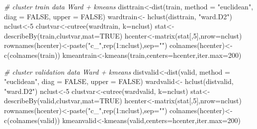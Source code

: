 \documentclass[
  11pt,
]{article}
\newenvironment{Shaded}{\begin{snugshade}}{\end{snugshade}}
\newcommand{\AttributeTok}[1]{\textcolor[rgb]{0.77,0.63,0.00}{#1}}
\newcommand{\CommentTok}[1]{\textcolor[rgb]{0.56,0.35,0.01}{\textit{#1}}}
\newcommand{\ConstantTok}[1]{\textcolor[rgb]{0.00,0.00,0.00}{#1}}
\newcommand{\DecValTok}[1]{\textcolor[rgb]{0.00,0.00,0.81}{#1}}
\newcommand{\FunctionTok}[1]{\textcolor[rgb]{0.00,0.00,0.00}{#1}}
\newcommand{\NormalTok}[1]{#1}
\newcommand{\OtherTok}[1]{\textcolor[rgb]{0.56,0.35,0.01}{#1}}
\newcommand{\SpecialCharTok}[1]{\textcolor[rgb]{0.00,0.00,0.00}{#1}}
\newcommand{\StringTok}[1]{\textcolor[rgb]{0.31,0.60,0.02}{#1}}
\begin{document}
\begin{Shaded}
\begin{Highlighting}[]
  \CommentTok{\# cluster train data Ward + kmeans}
\NormalTok{  disttrain}\OtherTok{\textless{}{-}}\FunctionTok{dist}\NormalTok{(train, }\AttributeTok{method =} \StringTok{"euclidean"}\NormalTok{, }\AttributeTok{diag =} \ConstantTok{FALSE}\NormalTok{, }\AttributeTok{upper =} \ConstantTok{FALSE}\NormalTok{)}
\NormalTok{  wardtrain}\OtherTok{\textless{}{-}} \FunctionTok{hclust}\NormalTok{(disttrain, }\StringTok{"ward.D2"}\NormalTok{)}
\NormalTok{  nclust}\OtherTok{\textless{}{-}}\DecValTok{5}
\NormalTok{  clustvar}\OtherTok{\textless{}{-}}\FunctionTok{cutree}\NormalTok{(wardtrain, }\AttributeTok{k=}\NormalTok{nclust)}
\NormalTok{  stat}\OtherTok{\textless{}{-}}\FunctionTok{describeBy}\NormalTok{(train,clustvar,}\AttributeTok{mat=}\ConstantTok{TRUE}\NormalTok{)}
\NormalTok{  hcenter}\OtherTok{\textless{}{-}}\FunctionTok{matrix}\NormalTok{(stat[,}\DecValTok{5}\NormalTok{],}\AttributeTok{nrow=}\NormalTok{nclust)}
  \FunctionTok{rownames}\NormalTok{(hcenter)}\OtherTok{\textless{}{-}}\FunctionTok{paste}\NormalTok{(}\StringTok{"c\_"}\NormalTok{,}\FunctionTok{rep}\NormalTok{(}\DecValTok{1}\SpecialCharTok{:}\NormalTok{nclust),}\AttributeTok{sep=}\StringTok{""}\NormalTok{)}
  \FunctionTok{colnames}\NormalTok{(hcenter)}\OtherTok{\textless{}{-}}\FunctionTok{c}\NormalTok{(}\FunctionTok{colnames}\NormalTok{(train))}
\NormalTok{  kmeantrain}\OtherTok{\textless{}{-}}\FunctionTok{kmeans}\NormalTok{(train,}\AttributeTok{centers=}\NormalTok{hcenter,}\AttributeTok{iter.max=}\DecValTok{200}\NormalTok{)}
  
  \CommentTok{\# cluster validation data Ward + kmeans}
\NormalTok{  distvalid}\OtherTok{\textless{}{-}}\FunctionTok{dist}\NormalTok{(valid, }\AttributeTok{method =} \StringTok{"euclidean"}\NormalTok{, }\AttributeTok{diag =} \ConstantTok{FALSE}\NormalTok{, }\AttributeTok{upper =} \ConstantTok{FALSE}\NormalTok{)}
\NormalTok{  wardvalid}\OtherTok{\textless{}{-}} \FunctionTok{hclust}\NormalTok{(distvalid, }\StringTok{"ward.D2"}\NormalTok{)}
\NormalTok{  nclust}\OtherTok{\textless{}{-}}\DecValTok{5}
\NormalTok{  clustvar}\OtherTok{\textless{}{-}}\FunctionTok{cutree}\NormalTok{(wardvalid, }\AttributeTok{k=}\NormalTok{nclust)}
\NormalTok{  stat}\OtherTok{\textless{}{-}}\FunctionTok{describeBy}\NormalTok{(valid,clustvar,}\AttributeTok{mat=}\ConstantTok{TRUE}\NormalTok{)}
\NormalTok{  hcenter}\OtherTok{\textless{}{-}}\FunctionTok{matrix}\NormalTok{(stat[,}\DecValTok{5}\NormalTok{],}\AttributeTok{nrow=}\NormalTok{nclust)}
  \FunctionTok{rownames}\NormalTok{(hcenter)}\OtherTok{\textless{}{-}}\FunctionTok{paste}\NormalTok{(}\StringTok{"c\_"}\NormalTok{,}\FunctionTok{rep}\NormalTok{(}\DecValTok{1}\SpecialCharTok{:}\NormalTok{nclust),}\AttributeTok{sep=}\StringTok{""}\NormalTok{)}
  \FunctionTok{colnames}\NormalTok{(hcenter)}\OtherTok{\textless{}{-}}\FunctionTok{c}\NormalTok{(}\FunctionTok{colnames}\NormalTok{(valid))}
\NormalTok{  kmeanvalid}\OtherTok{\textless{}{-}}\FunctionTok{kmeans}\NormalTok{(valid,}\AttributeTok{centers=}\NormalTok{hcenter,}\AttributeTok{iter.max=}\DecValTok{200}\NormalTok{)}
  

\end{Highlighting}
\end{Shaded}
\end{document}
